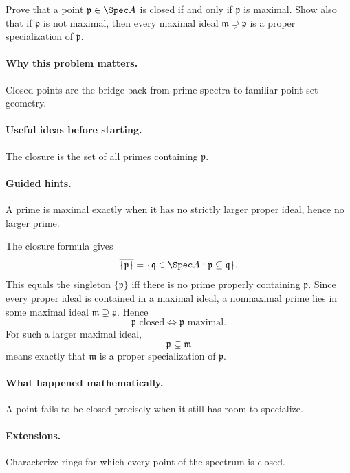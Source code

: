 \begin{problem}
Prove that a point $\mathfrak p\in\Spec A$ is closed if and only if $\mathfrak p$ is
maximal.  Show also that if $\mathfrak p$ is not maximal, then every maximal ideal
$\mathfrak m\supsetneq\mathfrak p$ is a proper specialization of $\mathfrak p$.
\end{problem}

\paragraph{Why this problem matters.}
Closed points are the bridge back from prime spectra to familiar point-set geometry.

\paragraph{Useful ideas before starting.}
The closure is the set of all primes containing $\mathfrak p$.

\paragraph{Guided hints.}
A prime is maximal exactly when it has no strictly larger proper ideal, hence no larger
prime.

\begin{solution}
The closure formula gives
\[
\overline{\{\mathfrak p\}}
=
\{\mathfrak q\in\Spec A:\mathfrak p\subseteq\mathfrak q\}.
\]
This equals the singleton $\{\mathfrak p\}$ iff there is no prime properly containing
$\mathfrak p$.  Since every proper ideal is contained in a maximal ideal, a nonmaximal
prime lies in some maximal ideal $\mathfrak m\supsetneq\mathfrak p$.  Hence
\[
\mathfrak p\text{ closed}
\iff
\mathfrak p\text{ maximal}.
\]
For such a larger maximal ideal,
\[
\mathfrak p\subsetneq\mathfrak m
\]
means exactly that $\mathfrak m$ is a proper specialization of $\mathfrak p$.
\end{solution}

\paragraph{What happened mathematically.}
A point fails to be closed precisely when it still has room to specialize.

\paragraph{Extensions.}
Characterize rings for which every point of the spectrum is closed.
